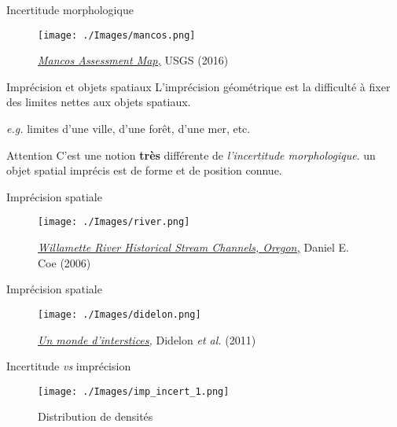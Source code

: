 \documentclass{beamer}
\begin{document}
\begin{frame}{Incertitude morphologique}
	\begin{figure}
		\centering
		\texttt{[image: ./Images/mancos.png]}
		\caption{\href{https://www.usgs.gov/media/images/2016-mancos-assessment-map}{\emph{Mancos Assessment Map,}} USGS (2016)}
	\end{figure}
\end{frame}

\begin{frame}{Imprécision et objets spatiaux}
\alert{L'imprécision géométrique} est la difficulté à fixer des limites nettes aux objets spatiaux.

{\small \emph{e.g.} limites d'une ville, d'une forêt, d'une mer, etc.}

 \begin{alertblock}{Attention}
  	C'est une notion \textbf{très} différente de \emph{l'incertitude morphologique}. \small {un objet 
  	spatial imprécis est de forme et de position connue.}
 \end{alertblock}
\end{frame}

\begin{frame}{Imprécision spatiale}
\begin{figure}
		\centering
		\texttt{[image: ./Images/river.png]}
		\caption{\href{https://www.oregongeology.org/pubs/ll/p-poster-willamette.htm}{\emph{Willamette River Historical Stream Channels, Oregon,}} Daniel E. Coe (2006)}
	\end{figure}
\end{frame}

\begin{frame}{Imprécision spatiale}
	\begin{figure}
		\centering
		\texttt{[image: ./Images/didelon.png]}
		\caption{\href{https://www.researchgate.net/publication/322860813_UN_MONDE_D'INTERSTICES_Apport_de_la_logique_floue_pour_l'analyse_des_cartes_interpretatives}{\emph{Un monde d'interstices,}} Didelon \emph{et al.} (2011)}
	\end{figure}
\end{frame}

\begin{frame}{Incertitude \emph{vs} imprécision}
		\begin{figure}
		\centering
		\texttt{[image: ./Images/imp\_incert\_1.png]}
		\caption{Distribution de densités}
		\end{figure}
\end{frame}
\end{document}
